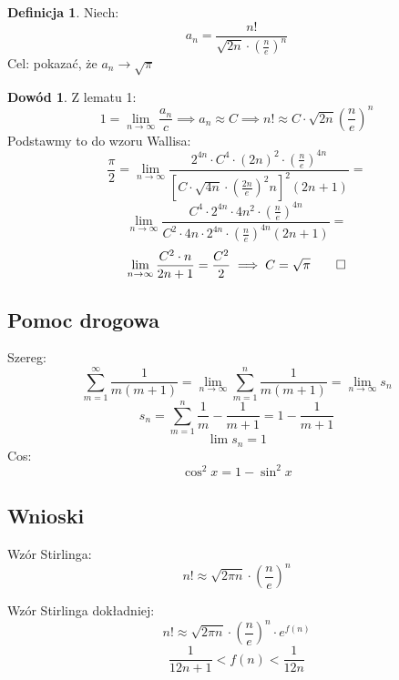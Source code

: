 \documentclass{article}
\theoremstyle{definition}
\newtheorem{de}{Definicja}[subsection]
\theoremstyle{definition}
\newtheorem{dd}{Dowód}[subsection]
\theoremstyle{definition}
\theoremstyle{definition}
\theoremstyle{definition}
\theoremstyle{definition}
\begin{document}
\begin{de}
    Niech:
    \[a_n = \frac{n!}{\sqrt{2n} \cdot \left(\frac{n}{e}\right)^n}\]
    Cel: pokazać, że $a_n \rightarrow \sqrt{\pi}$
\end{de}

\begin{dd}
    Z lematu 1:
    \[1 = \lim_{n\rightarrow \infty} \frac{a_n}{c} \implies a_n \approx C \implies n! \approx C\cdot \sqrt{2n} \left(\frac{n}{e}\right)^n\]
    Podstawmy to do wzoru Wallisa:
    \[\frac{\pi}{2} = \lim_{n\rightarrow \infty} \frac{2^{4n} \cdot C^4 \cdot (2n)^2 \cdot \left(\frac{n}{e}\right)^{4n}}{\left[C\cdot\sqrt{4n} \cdot \left(\frac{2n}{e}\right)^2n\right]^2 (2n+1)}=\]
    \[\lim_{n\rightarrow \infty} \frac{C^4 \cdot 2^{4n} \cdot 4n^2 \cdot \left(\frac{n}{e}\right)^{4n}}{C^2\cdot 4n \cdot 2^{4n} \cdot \left(\frac{n}{e}\right)^{4n} (2n+1)}=\]
    \[\lim_{n\rightarrow \infty} \frac{C^2\cdot n}{2n +1} = \frac{C^2}{2} \implies C=\sqrt{\pi}\qed\]
\end{dd}

\subsection{Pomoc drogowa}

Szereg:
\[\sum_{m=1}^{\infty} \frac{1}{m(m+1)} = \lim_{n\rightarrow \infty} \sum_{m=1}^{n} \frac{1}{m(m+1)} = \lim_{n\rightarrow \infty} s_n\]
\[s_n = \sum_{m=1}^{n} \frac{1}{m} - \frac{1}{m+1} = 1 - \frac{1}{m+1}\]
\[\lim s_n = 1\]
Cos:
\[\cos^2 x = 1 - \sin^2 x\]

\subsection{Wnioski}

Wzór Stirlinga:
\[n! \approx \sqrt{2\pi n} \cdot \left(\frac{n}{e}\right)^n\]

Wzór Stirlinga dokładniej:
\[n! \approx \sqrt{2\pi n} \cdot \left(\frac{n}{e}\right)^n \cdot e^{f(n)}\]
\[\frac{1}{12n+1} < f(n) < \frac{1}{12n}\]
\end{document}
